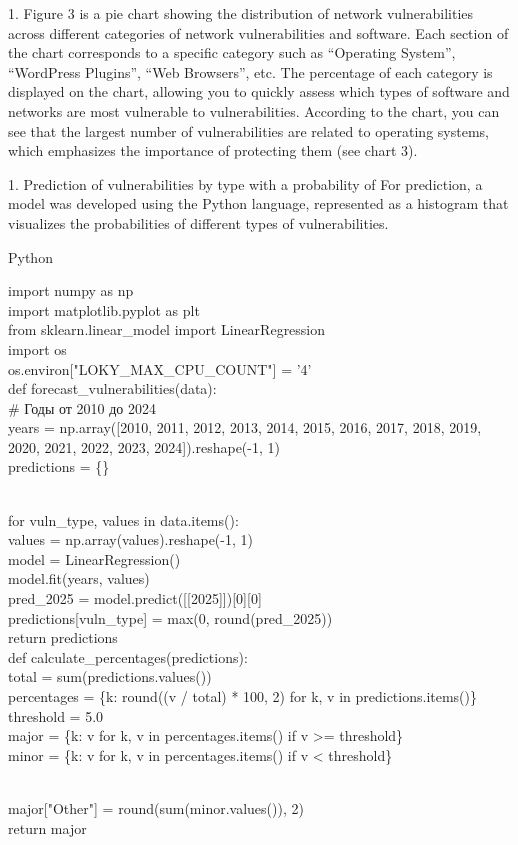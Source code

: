 1. Figure 3 is a pie chart showing the distribution of network
vulnerabilities across different categories of network vulnerabilities
and software. Each section of the chart corresponds to a specific
category such as ``Operating System'', ``WordPress Plugins'', ``Web
Browsers'', etc. The percentage of each category is displayed on the
chart, allowing you to quickly assess which types of software and
networks are most vulnerable to vulnerabilities. According to the
chart, you can see that the largest number of vulnerabilities are
related to operating systems, which emphasizes the importance of
protecting them (see chart 3).

1. Prediction of vulnerabilities by type with a probability of
For prediction, a model was developed using the Python language,
represented as a histogram that visualizes the probabilities of
different types of vulnerabilities.

Python

import numpy as np\\
import matplotlib.pyplot as plt\\
from sklearn.linear\_model import LinearRegression\\
import os\\
os.environ{[}"LOKY\_MAX\_CPU\_COUNT"{]} =
'4'{}\\
def forecast\_vulnerabilities(data):\\
\# Годы от 2010 до 2024\\
years = np.array({[}2010, 2011, 2012, 2013, 2014, 2015, 2016, 2017,
2018, 2019, 2020, 2021, 2022, 2023, 2024{]}).reshape(-1, 1)\\
predictions = \{\}\\
\strut \\
for vuln\_type, values in data.items():\\
values = np.array(values).reshape(-1, 1)\\
model = LinearRegression()\\
model.fit(years, values)\\
pred\_2025 = model.predict({[}{[}2025{]}{]}){[}0{]}{[}0{]}\\
predictions{[}vuln\_type{]} = max(0, round(pred\_2025))\\
return predictions\\
def calculate\_percentages(predictions):\\
total = sum(predictions.values())\\
percentages = \{k: round((v / total) * 100, 2) for k, v in
predictions.items()\}\\
threshold = 5.0\\
major = \{k: v for k, v in percentages.items() if v \textgreater=
threshold\}\\
minor = \{k: v for k, v in percentages.items() if v \textless{}
threshold\}\\
\strut \\
major{[}"Other"{]} = round(sum(minor.values()), 2)\\
return major


